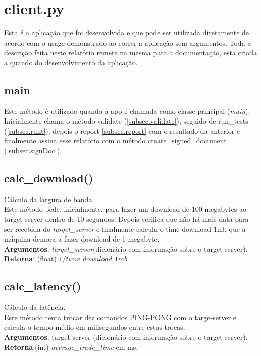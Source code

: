 \documentclass{report}
\begin{document}
\section{client.py}
\label{sec.client}
\hspace{5mm}Esta é a aplicação que foi desenvolvida e que pode ser utilizada diretamente de acordo com o usage demonstrado ao correr a aplicação sem argumentos. Toda a descrição feita neste relatório remete na mesma para a documentação, esta criada a quando do desenvolvimento da aplicação.

\subsection{main}
Este método é utilizado quando a app é chamada como classe principal (\textit{main}).
Inicialmente chama o método validate (\autoref{subsec.validate}), seguido de run\_tests (\autoref{subsec.runt}), depois o report \autoref{subsec.report} com o resultado da anterior e finalmente assina esse relatório com o método create\_signed\_document (\autoref{subsec.signDoc}).

\subsection{calc\_download()}
\label{subsec.download}
Cálculo da largura de banda.\\
Este método pede, inicialmente, para fazer um download de 100 megabytes ao target server dentro de 10 segundos. Depois verifica que não há mais data para ser recebida do \textit{target\_server} e finalmente calcula o time download 1mb que a máquina demora a fazer download de 1 megabyte.\\ 
\textbf{Argumentos}: \textit{target\_server}(dicionário com informação sobre o target server). 
\textbf{Retorna}: (float) $1/\textit{time\_download\_1mb}$

\subsection{calc\_latency()}
\label{subsec.latency}
\hspace{5mm}Cálculo da latência.\\ 
Este método tenta trocar dez comandos PING-PONG com o targe-server e calcula o tempo médio em milisegundos entre estas trocas.\\
\hspace{5mm}\textbf{Argumentos}: target server (dicionário com informação sobre o target server). 
\hspace{5mm}\textbf{Retorna}:(int) \textit{average\_trade\_time} em ms.
\end{document}
